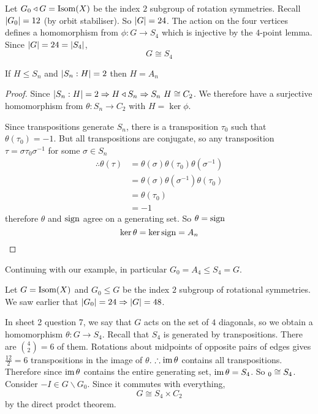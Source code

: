 \documentclass{article}
\begin{document}
\begin{eg}[Tetrahedron]
    Let $G_0 \triangleleft G = \operatorname{Isom}(X)$ be the index $2$ subgroup of rotation symmetries. Recall $\left\lvert G_0\right\rvert = 12$ (by orbit stabiliser). 
    So $\left\lvert G\right\rvert = 24$. The action on the four vertices defines a homomorphism from $\phi: G \rightarrow S_4$ which is injective by the $4$-point lemma.
    Since $\left\lvert G\right\rvert = 24 = \left\lvert S_4\right\rvert$,
    \[
        G \cong S_4  
    \]
\end{eg}
\begin{lemma}[Uniqueness of $A_4$]
    If $H \leq S_n$ and $\left\lvert S_n : H\right\rvert = 2$ then $H = A_n$
\end{lemma}
\begin{proof}
    Since $\left\lvert S_n : H\right\rvert = 2 \Rightarrow H \triangleleft S_n \Rightarrow S_n \ H \cong C_2$.
    We therefore have a surjective homomorphism from $\theta: S_n \rightarrow C_2$ with $H = \ker \phi$.

    Since transpositions generate $S_n$, there is a transposition $\tau_0$ such that $\theta(\tau_0) = -1$.
    But all transpositions are conjugate, so any transposition $\tau = \sigma \tau_0 \sigma^{-1}$ for some $\sigma \in S_n$
    \begin{align*}
        \therefore \theta(\tau) &= \theta(\sigma) \theta(\tau_0) \theta(\sigma^{-1}) \\
        &= \theta(\sigma) \theta(\sigma^{-1}) \theta(\tau_0) \tag{$C_2$ is abelian} \\
        &= \theta(\tau_0) \\
        &= -1
    \end{align*}
    therefore $\theta$ and $\operatorname{sign}$ agree on a generating set. So $\theta = \operatorname{sign}$
    \[
        \ker \theta = \ker \operatorname{sign} = A_n  
    \]
\end{proof}
Continuing with our example, in particular $G_0 = A_4 \leq S_4 = G$.

\begin{eg}
    Let $G = \operatorname{Isom}(X)$ and $G_0 \leq G$ be the index $2$ subgroup of rotational symmetries. 
    We saw earlier that $\left\lvert G_0\right\rvert = 24 \Rightarrow \left\lvert G\right\rvert = 48$.

    In sheet 2 question 7, we say that $G$ acts on the set of $4$ diagonals, so we obtain a homomorphism $\theta: G \rightarrow S_4$.
    Recall that $S_4$ is generated by transpositions.
    There are $\binom{4}{2} = 6$ of them.
    Rotations about midpoints of opposite pairs of edges gives $\frac{12}{2} = 6$ transpositions in the image of $\theta$.
    $\therefore \operatorname{im} \theta$ contains all transpositions. 
    Therefore since $\operatorname{im} \theta$ contains the entire generating set, $\operatorname{im} \theta = S_4$. 
    So $\relax_0 \cong S_4$. 
    Consider $-I \in G \backslash G_0$. Since it commutes with everything,
    \[
        G \cong S_4 \times C_2  
    \]
    by the direct prodct theorem.
\end{eg}
\end{document}

